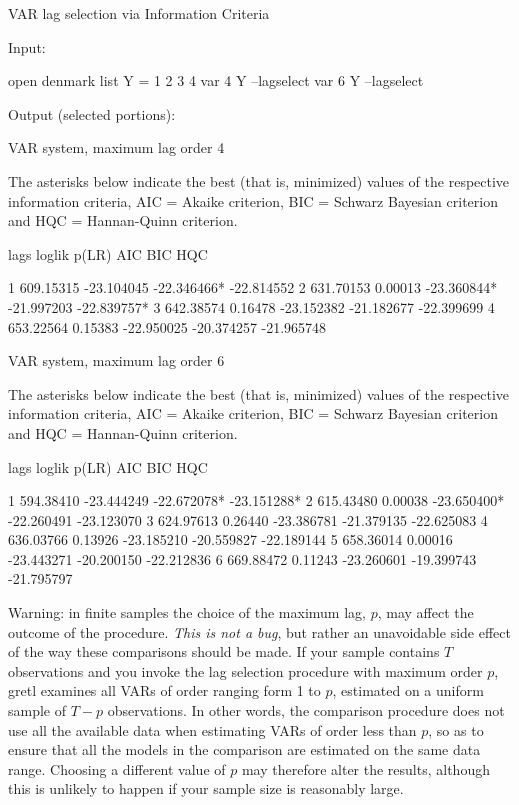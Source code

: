 \begin{script}[htbp]
  \caption{VAR lag selection via Information Criteria}
  \label{script:var-lagselect}
Input:
\begin{scodebit}
open denmark
list Y = 1 2 3 4
var 4 Y --lagselect
var 6 Y --lagselect
\end{scodebit}
Output (selected portions):
\begin{outbit}
VAR system, maximum lag order 4

The asterisks below indicate the best (that is, minimized) values
of the respective information criteria, AIC = Akaike criterion,
BIC = Schwarz Bayesian criterion and HQC = Hannan-Quinn criterion.

lags        loglik    p(LR)       AIC          BIC          HQC

   1     609.15315           -23.104045   -22.346466*  -22.814552 
   2     631.70153  0.00013  -23.360844*  -21.997203   -22.839757*
   3     642.38574  0.16478  -23.152382   -21.182677   -22.399699 
   4     653.22564  0.15383  -22.950025   -20.374257   -21.965748 

VAR system, maximum lag order 6

The asterisks below indicate the best (that is, minimized) values
of the respective information criteria, AIC = Akaike criterion,
BIC = Schwarz Bayesian criterion and HQC = Hannan-Quinn criterion.

lags        loglik    p(LR)       AIC          BIC          HQC

   1     594.38410           -23.444249   -22.672078*  -23.151288*
   2     615.43480  0.00038  -23.650400*  -22.260491   -23.123070 
   3     624.97613  0.26440  -23.386781   -21.379135   -22.625083 
   4     636.03766  0.13926  -23.185210   -20.559827   -22.189144 
   5     658.36014  0.00016  -23.443271   -20.200150   -22.212836 
   6     669.88472  0.11243  -23.260601   -19.399743   -21.795797 
\end{outbit}
\end{script}

Warning: in finite samples the choice of the maximum lag, $p$, may
affect the outcome of the procedure. \textit{This is not a bug}, but
rather an unavoidable side effect of the way these comparisons should
be made. If your sample contains $T$ observations and you invoke the
lag selection procedure with maximum order $p$, gretl examines
all VARs of order ranging form 1 to $p$, estimated on a uniform sample
of $T-p$ observations. In other words, the comparison procedure does
not use all the available data when estimating VARs of order less than
$p$, so as to ensure that all the models in the comparison are
estimated on the same data range. Choosing a different value of $p$
may therefore alter the results, although this is unlikely to happen
if your sample size is reasonably large.

